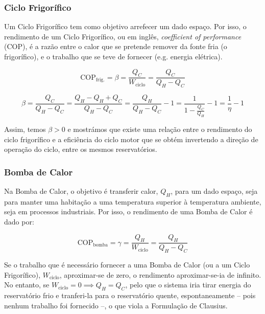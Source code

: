 \subsubsection{Ciclo Frigorífico}

Um Ciclo Frigorífico tem como objetivo arrefecer um dado espaço. Por isso, o rendimento de um Ciclo Frigorífico, ou em inglês, \textit{coefficient of performance} (COP), é a razão entre o calor que se pretende remover da fonte fria (o frigorífico), e o trabalho que se teve de fornecer (e.g. energia elétrica).

\begin{equation}
    \text{COP}_{\text{frig.}} = \beta = \frac{Q_C}{W_{\text{ciclo}}} = \frac{Q_C}{Q_H - Q_C}
\end{equation}

\begin{equation}
    \beta = \frac{Q_C}{Q_H - Q_C} = \frac{Q_H - Q_H + Q_C}{Q_H - Q_C} = \frac{Q_H}{Q_H - Q_C} - 1 = \frac{1}{1 - \frac{Q_C}{Q_H}} - 1 = \frac{1}{\eta} - 1
\end{equation}

Assim, temos $\beta > 0$ e mostrámos que existe uma relação entre o rendimento do ciclo frigorífico e a eficiência do ciclo motor que se obtém invertendo a direção de operação do ciclo, entre os mesmos reservatórios.

\subsubsection{Bomba de Calor}

Na Bomba de Calor, o objetivo é transferir calor, $Q_H$, para um dado espaço, seja para manter uma habitação a uma temperatura superior à temperatura ambiente, seja em processos industriais. Por isso, o rendimento de uma Bomba de Calor é dado por:

\begin{equation}
    \text{COP}_{\text{bomba}} = \gamma = \frac{Q_H}{W_{\text{ciclo}}} = \frac{Q_H}{Q_H - Q_C}
\end{equation}

Se o trabalho que é necessário fornecer a uma Bomba de Calor (ou a um Ciclo Frigorífico), $W_{\text{ciclo}}$, aproximar-se de zero, o rendimento aproximar-se-ia de infinito. No entanto, se $W_{\text{ciclo}} = 0 \implies Q_H = Q_C$, pelo que o sistema iria tirar energia do reservatório frio e tranferi-la para o reservatório quente, espontaneamente -- pois nenhum trabalho foi fornecido --, o que viola a Formulação de Clausius.

